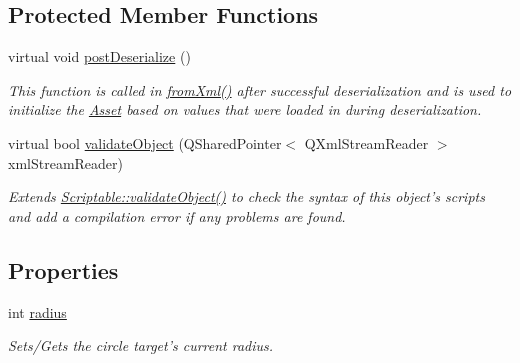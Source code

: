 \subsection*{Protected Member Functions}
\begin{DoxyCompactItemize}
\item 
virtual void \hyperlink{class_picto_1_1_circle_target_ad736fe02668f504c8635d48b7cef3d40}{post\-Deserialize} ()
\begin{DoxyCompactList}\small\item\em This function is called in \hyperlink{class_picto_1_1_asset_a8bed4da09ecb1c07ce0dab313a9aba67}{from\-Xml()} after successful deserialization and is used to initialize the \hyperlink{class_picto_1_1_asset}{Asset} based on values that were loaded in during deserialization. \end{DoxyCompactList}\item 
\hypertarget{class_picto_1_1_circle_target_a5bcb5062df8831568f43a452ad5c7160}{virtual bool \hyperlink{class_picto_1_1_circle_target_a5bcb5062df8831568f43a452ad5c7160}{validate\-Object} (Q\-Shared\-Pointer$<$ Q\-Xml\-Stream\-Reader $>$ xml\-Stream\-Reader)}\label{class_picto_1_1_circle_target_a5bcb5062df8831568f43a452ad5c7160}

\begin{DoxyCompactList}\small\item\em Extends \hyperlink{class_picto_1_1_scriptable_ab6e2944c43a3b5d418bf7b251594386d}{Scriptable\-::validate\-Object()} to check the syntax of this object's scripts and add a compilation error if any problems are found. \end{DoxyCompactList}\end{DoxyCompactItemize}
\subsection*{Properties}
\begin{DoxyCompactItemize}
\item 
\hypertarget{class_picto_1_1_circle_target_a92b430d79fa5aae82e025c7c7e3b6f68}{int \hyperlink{class_picto_1_1_circle_target_a92b430d79fa5aae82e025c7c7e3b6f68}{radius}}\label{class_picto_1_1_circle_target_a92b430d79fa5aae82e025c7c7e3b6f68}

\begin{DoxyCompactList}\small\item\em Sets/\-Gets the circle target's current radius. \end{DoxyCompactList}\end{DoxyCompactItemize}
